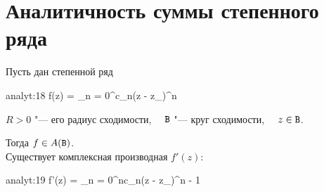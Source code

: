 \section{Аналитичность суммы степенного ряда}

\begin{theorem}
	Пусть дан степенной ряд
	\begin{equ}{analyt:18}
		f(z) = \sum_{n = 0}^\infty c_n(z - z_\circ)^n
	\end{equ}
	$ R > 0 $ "--- его радиус сходимости, $ \quad \mathtt{B} $ "--- круг сходимости, $ \quad z \in \mathtt{B} $.

	Тогда $ f \in A(\mathtt{B}) $. \\
	Существует комплексная производная $ f'(z) $:
	\begin{equ}{analyt:19}
		f'(z) = \sum_{n = 0}^\infty nc_n(z - z_\circ)^{n - 1}
	\end{equ}
\end{theorem}

